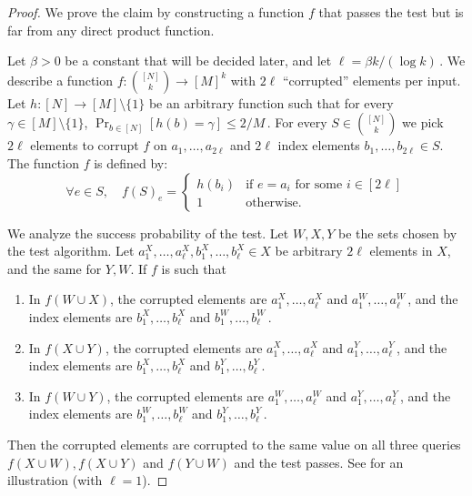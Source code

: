\documentclass{toc}
\newcommand\f{f} %
\newcommand\h{h} %
\newcommand{\sets}{\binom{[N]}{k}} %
\begin{document}
\begin{proof}
	We prove the claim by constructing a function $\f$ that passes the test but is far from any direct product function. 
	
	Let $\beta > 0$ be a constant that will be decided later, and let 
$\ell = {\beta k}/{(\log k)}$\,. %
 We describe a function $\f:\binom{[N]}{k}\rightarrow [M]^k$ with $2\ell$ ``corrupted'' elements per input.
	Let $\h:[N]\rightarrow[M]\setminus \{1\}$ be an arbitrary function such that for every $\gamma\in [M]\setminus  \{1\}$, $\Pr_{b\in[N]}[h(b)=\gamma]\leq
	2/M$\,. %
	For every $S\in \sets$ we pick $2\ell$ elements to corrupt $\f$ on $a_1,\ldots, a_{2\ell}$ and $2\ell$ index elements $b_1,\ldots,b_{2\ell}\in S$. The function $\f$ is defined by:
		\[  \forall e\in S, \quad f(S)_e = \begin{cases}
	h(b_i) & \text{if }e=a_i \text{ for some } i\in[2\ell]\\
	1 & \text{otherwise.} 
	\end{cases}  \]

	We %
analyze  %
%
the success probability of the test.  %
Let $W,X,Y$ be the sets chosen by the test algorithm. Let $a^X_1,\ldots, a^X_\ell,b^X_1,\ldots, b^X_\ell\in X$ be arbitrary $2\ell$ elements in $X$, and the same for $Y,W$.
	If $\f$ is such that
	\begin{enumerate}
	    \item In $\f(W\cup X)$, the corrupted elements are  $a_1^X,\ldots, a^X_\ell$ and $a^W_1,\ldots, a^W_\ell$\,, and the index elements are $b_1^X,\ldots, b_\ell^X$ and $b_1^W,\ldots, b_\ell^W$\,.
	    \item In $\f(X\cup Y)$, the corrupted elements are  $a_1^X,\ldots, a^X_\ell$ and $a^Y_1,\ldots, a^Y_\ell$\,, and the index elements are $b_1^X,\ldots, b_\ell^X$ and $b_1^Y,\ldots, b_\ell^Y$\,.
	    \item  In $f(W\cup Y)$, the corrupted elements are  $a^W_1,\ldots, a^W_\ell$ and $a^Y_1,\ldots, a^Y_\ell$\,, and the index elements are $b_1^W,\ldots, b_\ell^W$ and $b_1^Y,\ldots, b_\ell^Y$\,.
	\end{enumerate} 
	Then the corrupted elements are corrupted to the same value on all three queries $\f(X\cup W), \f(X\cup Y)$ and $\f(Y\cup W)$ and the test passes. See  for an illustration (with $\ell=1$).
	

\end{proof}
\end{document}
